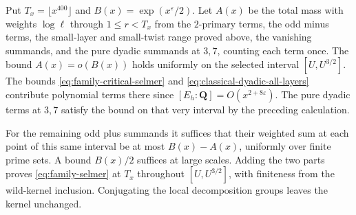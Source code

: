 Put \(T_x=\lfloor x^{400}\rfloor\) and \(B(x)=\exp(x^\varepsilon/2)\).
Let \(A(x)\) be the total mass with weights \(\log\ell\) through
\(1\le r<T_x\) from the \(2\)-primary terms, the odd minus terms,
the small-layer and small-twist range proved above, the vanishing
summands, and the pure dyadic summands at \(3,7\), counting each
term once. The bound \(A(x)=o(B(x))\) holds uniformly on the
selected interval \([U,U^{3/2}]\). The bounds
\eqref{eq:family-critical-selmer} and
\eqref{eq:classical-dyadic-all-layers} contribute polynomial terms
there since \([E_h:\mathbf Q]=O(x^{2+8\varepsilon})\).
The pure dyadic terms at \(3,7\) satisfy the bound on that very
interval by the preceding calculation.

For the remaining odd plus summands it suffices that their weighted
sum at each point of this same interval be at most \(B(x)-A(x)\),
uniformly over finite prime sets. A bound \(B(x)/2\) suffices at large
scales. Adding the two parts proves \eqref{eq:family-selmer} at \(T_x\)
throughout \([U,U^{3/2}]\), with finiteness from the wild-kernel inclusion.
Conjugating the local decomposition groups leaves the kernel unchanged.

